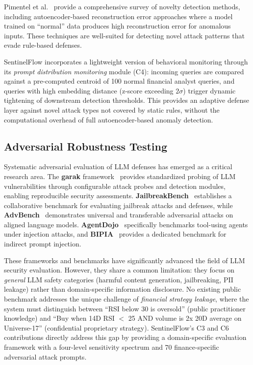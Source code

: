 \documentclass[journal,12pt,onecolumn,draftclsnofoot]{IEEEtran}
\begin{document}
Pimentel et al.~\cite{pimentel_novelty} provide a comprehensive survey of novelty detection methods, including autoencoder-based reconstruction error approaches where a model trained on ``normal'' data produces high reconstruction error for anomalous inputs. These techniques are well-suited for detecting novel attack patterns that evade rule-based defenses.

SentinelFlow incorporates a lightweight version of behavioral monitoring through its \textit{prompt distribution monitoring} module (C4): incoming queries are compared against a pre-computed centroid of 100 normal financial analyst queries, and queries with high embedding distance (z-score exceeding $2\sigma$) trigger dynamic tightening of downstream detection thresholds. This provides an adaptive defense layer against novel attack types not covered by static rules, without the computational overhead of full autoencoder-based anomaly detection.

\subsection{Adversarial Robustness Testing}
\label{Sect:LR_Adversarial}

Systematic adversarial evaluation of LLM defenses has emerged as a critical research area. The \textbf{garak} framework~\cite{garak_paper, garak_github} provides standardized probing of LLM vulnerabilities through configurable attack probes and detection modules, enabling reproducible security assessments. \textbf{JailbreakBench}~\cite{jailbreakbench} establishes a collaborative benchmark for evaluating jailbreak attacks and defenses, while \textbf{AdvBench}~\cite{advbench} demonstrates universal and transferable adversarial attacks on aligned language models. \textbf{AgentDojo}~\cite{agentdojo} specifically benchmarks tool-using agents under injection attacks, and \textbf{BIPIA}~\cite{bipia} provides a dedicated benchmark for indirect prompt injection.

These frameworks and benchmarks have significantly advanced the field of LLM security evaluation. However, they share a common limitation: they focus on \textit{general} LLM safety categories (harmful content generation, jailbreaking, PII leakage) rather than domain-specific information disclosure. No existing public benchmark addresses the unique challenge of \textit{financial strategy leakage}, where the system must distinguish between ``RSI below 30 is oversold'' (public practitioner knowledge) and ``Buy when 14D RSI $<$ 25 AND volume is 2x 20D average on Universe-17'' (confidential proprietary strategy). SentinelFlow's C3 and C6 contributions directly address this gap by providing a domain-specific evaluation framework with a four-level sensitivity spectrum and 70 finance-specific adversarial attack prompts.
\end{document}
